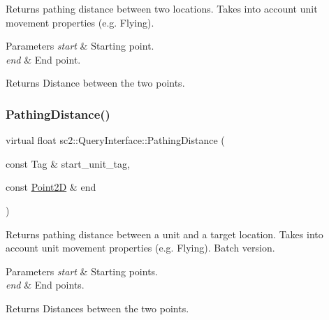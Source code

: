 Returns pathing distance between two locations. Takes into account unit movement properties (e.\+g. Flying). 
\begin{DoxyParams}{Parameters}
{\em start} & Starting point. \\
\hline
{\em end} & End point. \\
\hline
\end{DoxyParams}
\begin{DoxyReturn}{Returns}
Distance between the two points. 
\end{DoxyReturn}
\mbox{\label{classsc2_1_1_query_interface_a1a7216c7ad37273dc54e12a92fee7a64}} 
\subsubsection{\texorpdfstring{Pathing\+Distance()}{PathingDistance()}\hspace{0.1cm}{\footnotesize\ttfamily [2/2]}}
{\footnotesize\ttfamily virtual float sc2\+::\+Query\+Interface\+::\+Pathing\+Distance (\begin{DoxyParamCaption}\item[{const Tag \&}]{start\+\_\+unit\+\_\+tag,  }\item[{const \hyperlink{structsc2_1_1_point2_d}{Point2D} \&}]{end }\end{DoxyParamCaption})\hspace{0.3cm}{\ttfamily [pure virtual]}}

Returns pathing distance between a unit and a target location. Takes into account unit movement properties (e.\+g. Flying). Batch version. 
\begin{DoxyParams}{Parameters}
{\em start} & Starting points. \\
\hline
{\em end} & End points. \\
\hline
\end{DoxyParams}
\begin{DoxyReturn}{Returns}
Distances between the two points. 
\end{DoxyReturn}
\mbox{\label{classsc2_1_1_query_interface_ae78a9660fc9f03b1676bacf47c9a9180}} 
